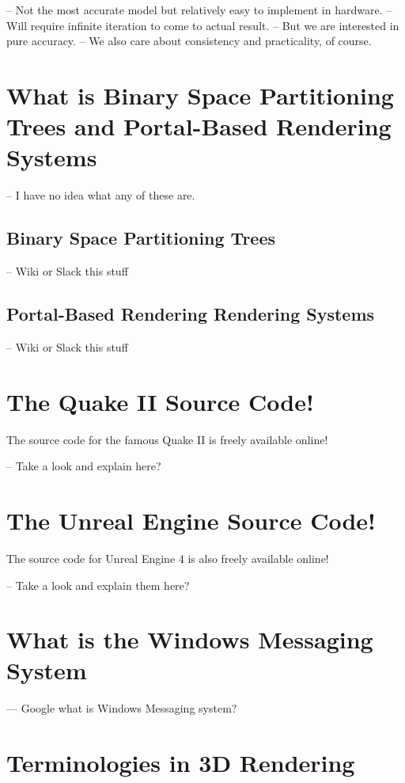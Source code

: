 \documentclass[a4paper,12pt]{book}
\begin{document}
-- Not the most accurate model but relatively easy to implement in hardware.
-- Will require infinite iteration to come to actual result.
-- But we are interested in pure accuracy.
-- We also care about consistency and practicality, of course.

\section{What is Binary Space Partitioning Trees and Portal-Based Rendering Systems}

-- I have no idea what any of these are.


\subsection{Binary Space Partitioning Trees}

-- Wiki or Slack this stuff

\subsection{Portal-Based Rendering Rendering Systems}

-- Wiki or Slack this stuff

\section{The Quake II Source Code!}

The source code for the famous Quake II is freely available online!

-- Take a look and explain here?

\section{The Unreal Engine Source Code!}

The source code for Unreal Engine 4 is also freely available online!

-- Take a look and explain them here?

\section{What is the Windows Messaging System}

--- Google what is Windows Messaging system?

\section{Terminologies in 3D Rendering}
\end{document}
